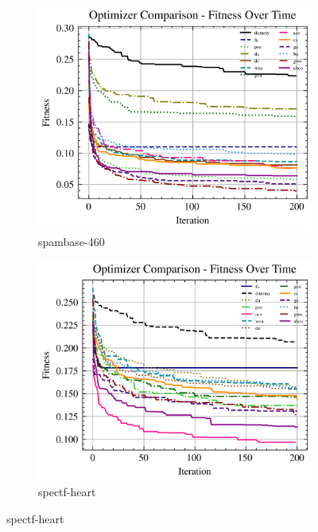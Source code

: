 \begin{figure}[htb]
    \centering
    \begin{subfigure}[b]{0.45\textwidth}
        \includegraphics[width=\textwidth]{imagenes/fitness_charts/img/binary/spambase-460/optimizers_fitness_svc.png}
        \caption{spambase-460}
        \label{fig:convergencia_spambase-460_svc}
    \end{subfigure}
    \begin{subfigure}[b]{0.45\textwidth}
        \includegraphics[width=\textwidth]{imagenes/fitness_charts/img/binary/spectf-heart/optimizers_fitness_svc.png}
        \caption{spectf-heart}
        \label{fig:convergencia_spectf-heart_svc}
    \end{subfigure}


\end{figure}
